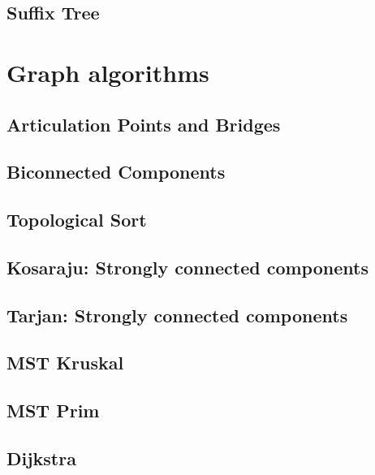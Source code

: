 \subsection{Suffix Tree}
\raggedbottom
\hrulefill

\section{Graph algorithms}
\subsection{Articulation Points and Bridges}
\raggedbottom
\hrulefill
\subsection{Biconnected Components}
\raggedbottom
\hrulefill
\subsection{Topological Sort}
\raggedbottom
\hrulefill
\subsection{Kosaraju: Strongly connected components}
\raggedbottom
\hrulefill
\subsection{Tarjan: Strongly connected components}
\raggedbottom
\hrulefill
\subsection{MST Kruskal}
\raggedbottom
\hrulefill
\subsection{MST Prim}
\raggedbottom
\hrulefill
\subsection{Dijkstra}
\raggedbottom
\hrulefill
